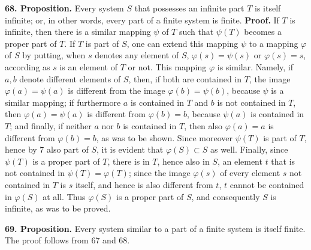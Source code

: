 \documentclass[11pt]{article}
\newcommand{\partof}{\mathrel{\subset}}
\begin{document}
\noindent\textbf{68. Proposition.} Every system $S$ that possesses an infinite part $T$ is itself infinite; or, in other words, every part of a finite system is finite. \textbf{Proof.} If $T$ is infinite, then there is a similar mapping $\psi$ of $T$ such that $\psi(T)$ becomes a proper part of $T$. If $T$ is part of $S$, one can extend this mapping $\psi$ to a mapping $\varphi$ of $S$ by putting, when $s$ denotes any element of $S$, $\varphi(s)=\psi(s)$ or $\varphi(s)=s$, according as $s$ is an element of $T$ or not. This mapping $\varphi$ is similar. Namely, if $a,b$ denote different elements of $S$, then, if both are contained in $T$, the image $\varphi(a)=\psi(a)$ is different from the image $\varphi(b)=\psi(b)$, because $\psi$ is a similar mapping; if furthermore $a$ is contained in $T$ and $b$ is not contained in $T$, then $\varphi(a)=\psi(a)$ is different from $\varphi(b)=b$, because $\psi(a)$ is contained in $T$; and finally, if neither $a$ nor $b$ is contained in $T$, then also $\varphi(a)=a$ is different from $\varphi(b)=b$, as was to be shown. Since moreover $\psi(T)$ is part of $T$, hence by 7 also part of $S$, it is evident that $\varphi(S)\partof S$ as well. Finally, since $\psi(T)$ is a proper part of $T$, there is in $T$, hence also in $S$, an element $t$ that is not contained in $\psi(T)=\varphi(T)$; since the image $\varphi(s)$ of every element $s$ not contained in $T$ is $s$ itself, and hence is also different from $t$, $t$ cannot be contained in $\varphi(S)$ at all. Thus $\varphi(S)$ is a proper part of $S$, and consequently $S$ is infinite, as was to be proved.

\noindent\textbf{69. Proposition.} Every system similar to a part of a finite system is itself finite. The proof follows from 67 and 68.
\end{document}
